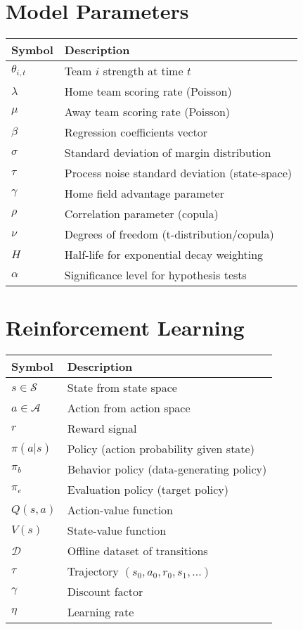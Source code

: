 \section*{Model Parameters}

\begin{tabular}{ll}
\toprule
\textbf{Symbol} & \textbf{Description} \\
\midrule
$\theta_{i,t}$ & Team $i$ strength at time $t$ \\
$\lambda$ & Home team scoring rate (Poisson) \\
$\mu$ & Away team scoring rate (Poisson) \\
$\beta$ & Regression coefficients vector \\
$\sigma$ & Standard deviation of margin distribution \\
$\tau$ & Process noise standard deviation (state-space) \\
$\gamma$ & Home field advantage parameter \\
$\rho$ & Correlation parameter (copula) \\
$\nu$ & Degrees of freedom (t-distribution/copula) \\
$H$ & Half-life for exponential decay weighting \\
$\alpha$ & Significance level for hypothesis tests \\
\bottomrule
\end{tabular}

\section*{Reinforcement Learning}

\begin{tabular}{ll}
\toprule
\textbf{Symbol} & \textbf{Description} \\
\midrule
$s \in \mathcal{S}$ & State from state space \\
$a \in \mathcal{A}$ & Action from action space \\
$r$ & Reward signal \\
$\pi(a|s)$ & Policy (action probability given state) \\
$\pi_b$ & Behavior policy (data-generating policy) \\
$\pi_e$ & Evaluation policy (target policy) \\
$Q(s,a)$ & Action-value function \\
$V(s)$ & State-value function \\
$\mathcal{D}$ & Offline dataset of transitions \\
$\tau$ & Trajectory $(s_0, a_0, r_0, s_1, ...)$ \\
$\gamma$ & Discount factor \\
$\eta$ & Learning rate \\
\bottomrule
\end{tabular}

